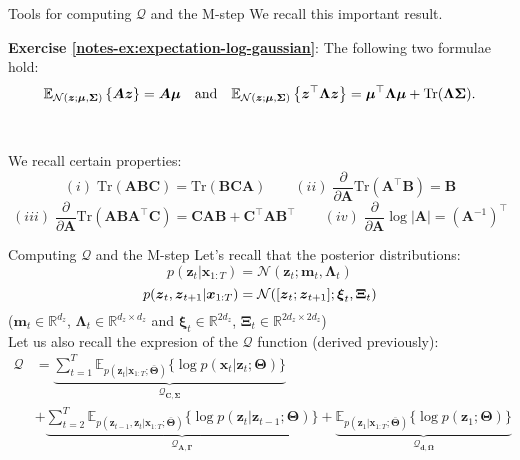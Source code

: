 \documentclass{beamer}
\newcommand{\MN}{{\mathcal N}}
\newcommand{\bs}[1]{\boldsymbol{#1}}
\newcommand{\exercise}[2]{\noindent\colorbox{blue!10}{\parbox{0.995\textwidth}{\textbf{Exercise \ref{notes-ex:#1}}: #2}}\\}
\newcommand{\expectation}[2][]{%
\ifthenelse { \equal {#1} {} }%
{\mathbb{E}\left\{#2\right\}}%
{\mathbb{E}_{#1}\left\{#2\right\}}
}
\begin{document}
\begin{frame}{Tools for computing $\mathcal{Q}$ and the M-step}
 We recall this important result.\vspace{3mm}\\
 \exercise{expectation-log-gaussian}{The following two formulae hold:
\[
 \expectation[\mathcal{N}(\bs{z};\bs{\mu},\bs{\Sigma})]{\bs{A}\bs{z}} = \bs{A}\bs{\mu} \quad\text{and}\quad \expectation[\mathcal{N}(\bs{z};\bs{\mu},\bs{\Sigma})]{\bs{z}^\top\bs{\Lambda}\bs{z}} = \bs{\mu}^\top\bs{\Lambda}\bs{\mu} + \textrm{Tr}(\bs{\Lambda}\bs{\Sigma}).  
\]
}\vspace{3mm}

We recall certain properties:
 {\small
 \begin{equation*}
 (i)\;\textrm{Tr}(\bs{A}\bs{B}\bs{C}) = \textrm{Tr}(\bs{B}\bs{C}\bs{A}) \qquad 
 (ii)\;\frac{\partial }{\partial \bs{A}} \textrm{Tr}(\bs{A}^\top \bs{B}) = \bs{B}
\end{equation*}
\begin{equation*}
 (iii)\; \frac{\partial }{\partial \bs{A}} \textrm{Tr}(\bs{A} \bs{B} \bs{A}^{\top} \bs{C}) = \bs{C}\bs{A}\bs{B}+\bs{C}^\top\bs{A}\bs{B}^\top \qquad 
 (iv)\; \frac{\partial }{\partial \bs{A}} \log|\bs{A}| = (\bs{A}^{-1})^\top
\end{equation*}}
\end{frame}

\begin{frame}{Computing $\mathcal{Q}$ and the M-step}
Let's recall that the posterior distributions:
\begin{equation*}
 p(\bs{z}_t|\bs{x}_{1:T}) = \MN(\bs{z}_t;\bs{m}_t,\bs{\Lambda}_{t})
\end{equation*}
\begin{equation*}
 p(\bs{z}_t,\bs{z}_{t+1}|\bs{x}_{1:T}) = {\cal N}([\bs{z}_{t};\bs{z}_{t+1}]; \bs{\xi}_t,\bs{\Xi}_t)
\end{equation*}
{\small ($\bs{m}_t\in\mathbb{R}^{d_z}$, $\bs{\Lambda}_{t}\in\mathbb{R}^{d_z\times d_z}$ and $\bs{\xi}_t\in\mathbb{R}^{2d_z}$, $\bs{\Xi}_t\in\mathbb{R}^{2d_z\times2d_z}$)}\vspace{3mm}\\

Let us also recall the expresion of the $\mathcal{Q}$ function (derived previously):
  \begin{align*}
   \mathcal{Q} &= \underbrace{\sum_{t=1}^T \mathbb{E}_{p(\bs{z}_{t}|\bs{x}_{1:T};\bar{\bs{\Theta}})} \{\log p(\bs{x}_t|\bs{z}_t;\bs{\Theta})\}}_{\mathcal{Q}_{\bs{C},\bs{\Sigma}}}\\ &+ \underbrace{\sum_{t=2}^T\mathbb{E}_{p(\bs{z}_{t-1},\bs{z}_t|\bs{x}_{1:T};\bar{\bs{\Theta}})}\{ \log p(\bs{z}_t|\bs{z}_{t-1};\bs{\Theta})\}}_{\mathcal{Q}_{\bs{A},\bs{\Gamma}}} + \underbrace{\mathbb{E}_{p(\bs{z}_{1}|\bs{x}_{1:T};\bar{\bs{\Theta}})}\{\log p(\bs{z}_1;\bs{\Theta}) \}}_{\mathcal{Q}_{\bs{d},\bs{\Omega}}}
  \end{align*}
\end{frame}
\end{document}
